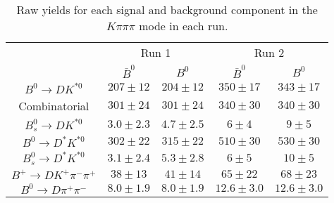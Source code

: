 \begin{table}
  \centering
  \begin{tabular}{ccccc}
      \toprule
       & \multicolumn{2}{c}{Run 1} & \multicolumn{2}{c}{Run 2} \\
      & $\bar{B}^0$ & $B^0$& $\bar{B}^0$ & $B^0$ \\
      \midrule
      $B^0 \to DK^{*0}$ & $207 \pm 12$ & $204 \pm 12$ & $350 \pm 17$ & $343 \pm 17$ \\
      Combinatorial & $301 \pm 24$ & $301 \pm 24$ & $340 \pm 30$ & $340 \pm 30$ \\
      $B^0_s \to DK^{*0}$ & $3.0 \pm 2.3$ & $4.7 \pm 2.5$ & $6 \pm 4$ & $9 \pm 5$ \\
      $B^0 \to D^*K^{*0}$ & $302 \pm 22$ & $315 \pm 22$ & $510 \pm 30$ & $530 \pm 30$ \\
      $B^0_s \to D^*K^{*0}$ & $3.1 \pm 2.4$ & $5.3 \pm 2.8$ & $6 \pm 5$ & $10 \pm 5$ \\
      $B^+ \to DK^+\pi^-\pi^+$ & $38 \pm 13$ & $41 \pm 14$ & $65 \pm 22$ & $68 \pm 23$ \\
      $B^0 \to D\pi^+\pi^-$ & $8.0 \pm 1.9$ & $8.0 \pm 1.9$ & $12.6 \pm 3.0$ & $12.6 \pm 3.0$ \\
      \bottomrule
      \end{tabular}
\caption{Raw yields for each signal and background component in the $K\pi\pi\pi$ mode in each run.}
\label{tab:yields_Kpipipi}
\end{table}
